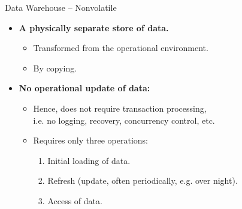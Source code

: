 \begin{frame}{Data Warehouse -- Nonvolatile}
	\begin{itemize}
		\item \textbf{A {\color{airforceblue}physically separate} store of data.}
		      \begin{itemize}
			      \item Transformed from the operational environment.
			      \item By {\color{airforceblue}copying}.
		      \end{itemize}
		\item \textbf{No operational update of data:}
		      \begin{itemize}
			      \item Hence, does not require transaction processing, \\
			            i.e. no logging, recovery, concurrency control, etc.
			      \item Requires only three operations:
			            \begin{enumerate}
				            \item Initial loading of data.
				            \item Refresh (update, often periodically, e.g. over night).
				            \item Access of data.
			            \end{enumerate}
		      \end{itemize}
	\end{itemize}
\end{frame}


